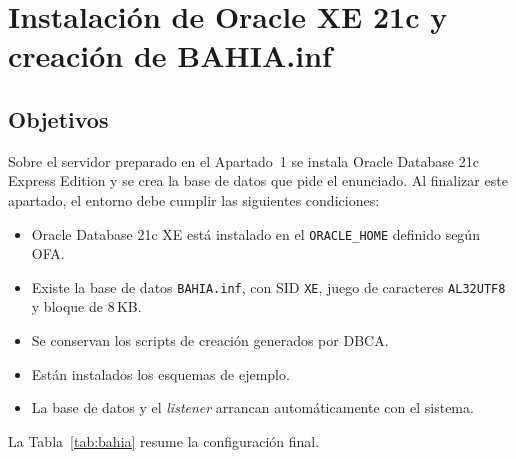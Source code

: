 
\newpage
\section{Instalación de Oracle XE 21c y creación de BAHIA.inf}
\label{sec:apartado2}

\subsection{Objetivos}

Sobre el servidor preparado en el Apartado~1 se instala Oracle Database 21c Express Edition y se crea la base de datos que pide el enunciado. Al finalizar este apartado, el entorno debe cumplir las siguientes condiciones:

\begin{itemize}
    \item Oracle Database 21c XE está instalado en el \texttt{ORACLE\_HOME} definido según OFA.
    \item Existe la base de datos \texttt{BAHIA.inf}, con SID \texttt{XE}, juego de caracteres \texttt{AL32UTF8} y bloque de 8\,KB.
    \item Se conservan los scripts de creación generados por DBCA.
    \item Están instalados los esquemas de ejemplo.
    \item La base de datos y el \textit{listener} arrancan automáticamente con el sistema.
\end{itemize}

La Tabla~\ref{tab:bahia} resume la configuración final.

